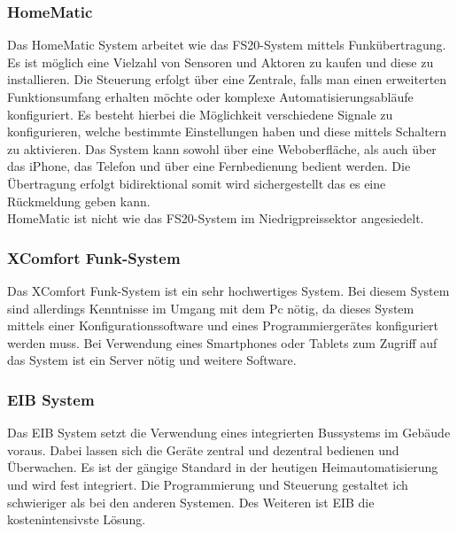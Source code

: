 \subsubsection{HomeMatic}
Das HomeMatic System arbeitet wie das FS20-System mittels Funkübertragung. Es ist möglich eine Vielzahl von Sensoren und Aktoren zu kaufen und diese zu installieren. Die Steuerung erfolgt über eine 
Zentrale, falls man einen erweiterten Funktionsumfang erhalten möchte oder komplexe Automatisierungsabläufe konfiguriert. Es besteht hierbei die Möglichkeit verschiedene Signale zu konfigurieren,  welche bestimmte Einstellungen haben und diese mittels Schaltern zu aktivieren. 
Das System kann sowohl über eine Weboberfläche, als auch über das iPhone, das Telefon und über eine Fernbedienung bedient werden. Die Übertragung erfolgt bidirektional somit wird sichergestellt das es eine Rückmeldung geben kann.
\\
HomeMatic ist nicht wie das FS20-System im Niedrigpreissektor angesiedelt.

\subsubsection{XComfort Funk-System}
Das XComfort Funk-System ist ein sehr hochwertiges System. 
Bei diesem System sind allerdings Kenntnisse im Umgang mit dem Pc nötig, da dieses System mittels einer Konfigurationssoftware und eines 
Programmiergerätes konfiguriert werden muss. Bei Verwendung eines Smartphones oder Tablets zum Zugriff auf das System ist ein Server nötig und weitere Software.

\subsubsection{EIB System}
Das EIB System setzt die Verwendung eines integrierten Bussystems im Gebäude voraus. Dabei lassen sich die Geräte zentral und dezentral bedienen und Überwachen. Es ist der gängige Standard in der heutigen Heimautomatisierung und wird fest integriert. Die Programmierung und Steuerung gestaltet ich schwieriger als bei den anderen Systemen. Des Weiteren ist EIB die kostenintensivste Lösung. 

